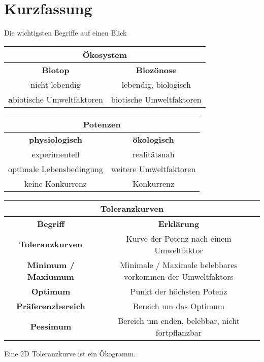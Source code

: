 \documentclass{article}
\begin{document}
 
\section*{Kurzfassung}
Die wichtigsten Begriffe auf einen Blick \newline
\begin{center}
\begin{tabular}{ |c|c| }
\hline
 \multicolumn{2}{|c|}{\textbf{Ökosystem}} \\
\hline
 \textbf{Biotop} & \textbf{Biozönose} \\
\hline
 nicht lebendig & lebendig, biologisch \\
\hline
 \textbf{a}biotische Umweltfaktoren & biotische Umweltfaktoren \\
\hline
\end{tabular}
\end{center} 
 
\begin{center}
\begin{tabular}{ |c|c| } 
\hline
 \multicolumn{2}{|c|}{\textbf{Potenzen}} \\ 
\hline
 \textbf{physiologisch} & \textbf{ökologisch} \\
\hline
 experimentell & realitätsnah \\
\hline
 optimale Lebensbedingung & weitere Umweltfaktoren \\
\hline
 keine Konkurrenz & Konkurrenz \\
\hline
\end{tabular}
\end{center}
 
\begin{center}
\begin{tabular}{ |c|c| } 
\hline
 \multicolumn{2}{|c|}{\textbf{Toleranzkurven}} \\ 
\hline
 \textbf{Begriff} & \textbf{Erklärung} \\
\hline
 \textbf{Toleranzkurven} & Kurve der Potenz nach einem Umweltfaktor \\
\hline
 \textbf{Minimum / Maxiumum} & Minimale / Maximale belebbares vorkommen der Umweltfaktors \\
\hline
 \textbf{Optimum} & Punkt der höchsten Potenz \\
\hline
 \textbf{Präferenzbereich} & Bereich um das Optimum \\
\hline
 \textbf{Pessimum} & Bereich um enden, belebbar, nicht fortpflanzbar \\
\hline
\end{tabular}
\end{center}  
Eine 2D Toleranzkurve ist ein Ökogramm.   
 
\end{document}
